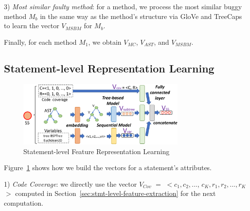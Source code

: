 
3) {\em Most similar faulty method}: for a method, we
process the most similar buggy method $M_b$ 
in the same way as the method's structure via GloVe and TreeCaps to
learn the vector $V_{MSBM}$ for $M_b$.

Finally, for each method $M_1$, we obtain $V_{MC}$, $V_{AST}$, and
$V_{MSBM}$.


\subsection{Statement-level Representation Learning}

\begin{figure}[t]
	\centering
	\includegraphics[width=3.3in]{graphs/step-2-statement-new-2.png}
        \vspace{-9pt}
	\caption{Statement-level Feature Representation Learning}
	\label{statement-level-feature-learning}
\end{figure}

Figure~\ref{statement-level-feature-learning} shows how we build the
vectors for a statement's attributes.

1) {\em Code Coverage}: we directly use the vector
$V_{Cov}$ $=$ $<$$c_1, c_2, ...$, $c_K, r_1, r_2, ..., r_K$$>$ computed in
Section~\ref{sec:stmt-level-feature-extraction} for the next
computation.

